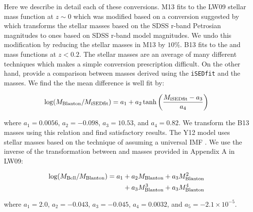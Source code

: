\documentclass[a4paper,fleqn,usenatbib]{mnras}
\begin{document}
Here we describe in detail each of these conversions.  M13 fits to the LW09 stellar mass function at $z \sim 0$ which was modified based on a conversion suggested by \citet{Guo:2010do} which transforms the stellar masses based on the SDSS r-band Petrosian magnitudes to ones based on SDSS r-band model magnitudes.  We undo this modification by reducing the stellar masses in M13 by $10\%$.  B13 fits to the \citet{Baldry:2008hm} and \citet{Moustakas:2013il} mass functions at $z < 0.2$.  The \citet{Baldry:2008hm} stellar masses are an average of many different techniques which makes a simple conversion prescription difficult.  On the other hand, \citet{Moustakas:2013il} provide a comparison between masses derived using the {\tt iSEDfit} and the \citet{Blanton:2007cv} masses.  We find the the mean difference is well fit by:
%
\begin{linenomath}
\begin{equation}
\log(M_{\rm Blanton}/M_{\rm iSEDfit}) = a_1+a_2\tanh\left(\frac{M_{\rm iSEDfit} - a_3}{a_4}\right)
\end{equation}
\end{linenomath}
%
where $a_1 = 0.0056$, $a_2 = -0.098$, $a_3 =10.53$, and $a_4 = 0.82$.  We transform the B13 masses using this relation and find satisfactory results.  The Y12 model uses stellar masses based on the technique of \citet{Bell:2003hs} assuming a universal IMF \citep{Kroupa:2001ki, Borch:2006eu}.  We use the inverse of the transformation between \citet{Bell:2003hs} and \citet{Blanton:2007cv} masses provided in Appendix A in LW09:
%
\begin{linenomath}
\begin{align}
\log(M_{\rm Bell}/M_{\rm Blanton}) = a_1 &+ a_2 M_{\rm Blanton} + a_3 M_{\rm Blanton}^2 \nonumber \\
  & + a_3 M_{\rm Blanton}^3 + a_3 M_{\rm Blanton}^4
\end{align}
\end{linenomath}
%
where $a_1 = 2.0$, $a_2 = -0.043$, $a_3 = -0.045$, $a_4 = 0.0032$, and $a_5=-2.1\times10^{-5}$.
\end{document}
